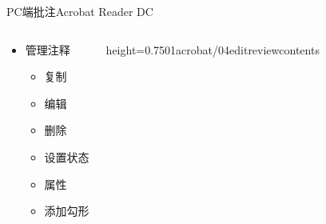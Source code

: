 \documentclass[fontset = none, t, aspectratio=169]{ctexbeamer}
\begin{document}
\begin{frame}{PC端批注}{Acrobat Reader DC}
  \vspace{-3ex}
  \begin{columns}[t,onlytextwidth]
    \begin{spacing}{2.0}
    \begin{itemize}
    \item 管理注释
      \begin{itemize}%
      \item 复制
      \item 编辑
      \item 删除
      \item 设置状态
      \item 属性
      \item 添加勾形
      \end{itemize}
    \end{itemize}
    \end{spacing}
    \begin{center}
      \begin{annotationimage}{height=0.75\textheight}{01acrobat/04editreviewcontents}
      \end{annotationimage}
    \end{center}
  \end{columns}
\end{frame}
\end{document}
